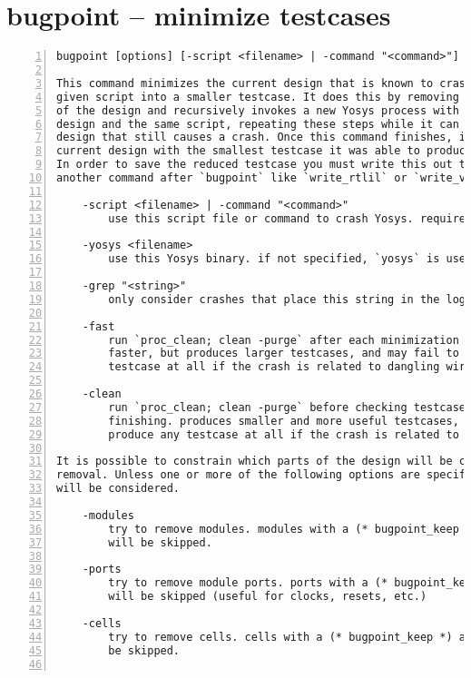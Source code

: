 \section{bugpoint -- minimize testcases}
\label{cmd:bugpoint}
\begin{lstlisting}[numbers=left,frame=single]
    bugpoint [options] [-script <filename> | -command "<command>"]

This command minimizes the current design that is known to crash Yosys with the
given script into a smaller testcase. It does this by removing an arbitrary part
of the design and recursively invokes a new Yosys process with this modified
design and the same script, repeating these steps while it can find a smaller
design that still causes a crash. Once this command finishes, it replaces the
current design with the smallest testcase it was able to produce.
In order to save the reduced testcase you must write this out to a file with
another command after `bugpoint` like `write_rtlil` or `write_verilog`.

    -script <filename> | -command "<command>"
        use this script file or command to crash Yosys. required.

    -yosys <filename>
        use this Yosys binary. if not specified, `yosys` is used.

    -grep "<string>"
        only consider crashes that place this string in the log file.

    -fast
        run `proc_clean; clean -purge` after each minimization step. converges
        faster, but produces larger testcases, and may fail to produce any
        testcase at all if the crash is related to dangling wires.

    -clean
        run `proc_clean; clean -purge` before checking testcase and after
        finishing. produces smaller and more useful testcases, but may fail to
        produce any testcase at all if the crash is related to dangling wires.

It is possible to constrain which parts of the design will be considered for
removal. Unless one or more of the following options are specified, all parts
will be considered.

    -modules
        try to remove modules. modules with a (* bugpoint_keep *) attribute
        will be skipped.

    -ports
        try to remove module ports. ports with a (* bugpoint_keep *) attribute
        will be skipped (useful for clocks, resets, etc.)

    -cells
        try to remove cells. cells with a (* bugpoint_keep *) attribute will
        be skipped.


\end{lstlisting}
